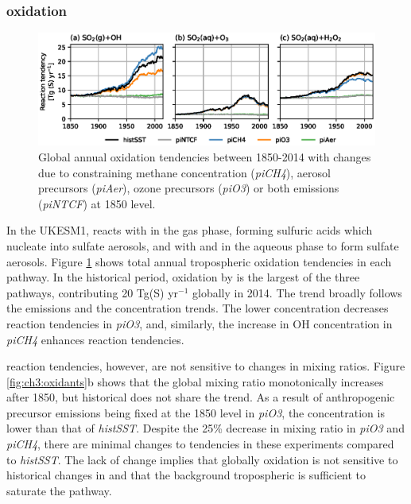 \subsubsection{ oxidation}
\label{sec:ch3:oxidation}


\begin{figure}
    \centering
    \includegraphics[width=\linewidth]{Chapter3/Figs/f03_oxidation.eps}
    \caption[Global annual  oxidation tendencies]{Global annual  oxidation tendencies between 1850-2014 with changes due to constraining  methane concentration (\textit{piCH4}), aerosol precursors (\textit{piAer}), ozone precursors (\textit{piO3}) or both emissions (\textit{piNTCF}) at 1850 level.}
    \label{fig:ch3:oxidation}
\end{figure}


In the UKESM1,  reacts with  in the gas phase, forming sulfuric acids which nucleate into sulfate aerosols, and with  and  in the aqueous phase to form sulfate aerosols. Figure \ref{fig:ch3:oxidation} shows total annual tropospheric  oxidation tendencies in each pathway. In the historical period,  oxidation by  is the largest of the three pathways, contributing 20 Tg(S) yr$^{-1}$ globally in 2014. The  trend broadly follows the  emissions and the  concentration trends. The lower  concentration decreases  reaction tendencies in \textit{piO3}, and, similarly, the increase in OH concentration in \textit{piCH4} enhances  reaction tendencies.

 reaction tendencies, however, are not sensitive to changes in  mixing ratios. Figure \ref{fig:ch3:oxidants}b shows that the global  mixing ratio monotonically increases after 1850, but historical  does not share the trend. As a result of anthropogenic  precursor emissions being fixed at the 1850 level in \textit{piO3}, the  concentration is lower than that of \textit{histSST}. Despite the 25\% decrease in  mixing ratio in \textit{piO3} and \textit{piCH4}, there are minimal changes to  tendencies in these experiments compared to \textit{histSST}. The lack of change implies that globally  oxidation is not sensitive to historical changes in  and that the background tropospheric  is sufficient to saturate the pathway. 

